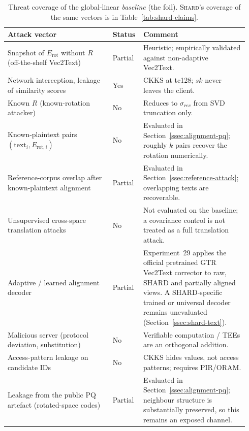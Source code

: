 \documentclass[11pt,a4paper]{article}
\begin{document}
\begin{table}[tbp]
\centering
\caption{Threat coverage of the global-linear \emph{baseline} (the foil).
\textsc{Shard}'s coverage of the same vectors is in
Table~\ref{tab:shard-claims}.}\label{tab:threat}
\small
\begin{tabular}{@{}p{0.42\linewidth}p{0.10\linewidth}p{0.42\linewidth}@{}}
\toprule
\textbf{Attack vector} & \textbf{Status} & \textbf{Comment} \\ \midrule
Snapshot of $E_{\mathrm{rot}}$ without $R$ (off-the-shelf Vec2Text) &
Partial &
Heuristic; empirically validated against non-adaptive Vec2Text. \\
Network interception, leakage of similarity scores &
Yes &
CKKS at tc128; $sk$ never leaves the client. \\
Known $R$ (known-rotation attacker) &
No &
Reduces to $\sigma_{rec}$ from SVD truncation only. \\
Known-plaintext pairs $(\mathrm{text}_i, E_{\mathrm{rot},i})$ &
No &
Evaluated in Section~\ref{ssec:alignment-pq}; roughly $k$ pairs
recover the rotation numerically. \\
Reference-corpus overlap after known-plaintext alignment &
Partial &
Evaluated in Section~\ref{ssec:reference-attack}; overlapping texts are
recoverable. \\
Unsupervised cross-space translation attacks &
No &
Not evaluated on the baseline; a covariance control is not treated as a full
translation attack. \\
Adaptive / learned alignment decoder &
Partial &
Experiment~29 applies the official pretrained GTR Vec2Text corrector to raw,
SHARD and partially aligned views. A SHARD-specific trained or universal
decoder remains unevaluated (Section~\ref{ssec:shard-text}). \\
Malicious server (protocol deviation, substitution) &
No &
Verifiable computation / TEEs are an orthogonal addition. \\
Access-pattern leakage on candidate IDs &
No &
CKKS hides values, not access patterns; requires PIR/ORAM. \\
Leakage from the public PQ artefact (rotated-space codes) &
Partial &
Evaluated in Section~\ref{ssec:alignment-pq}; neighbour structure is
substantially preserved, so this remains an exposed channel. \\
\bottomrule
\end{tabular}
\end{table}
\end{document}
